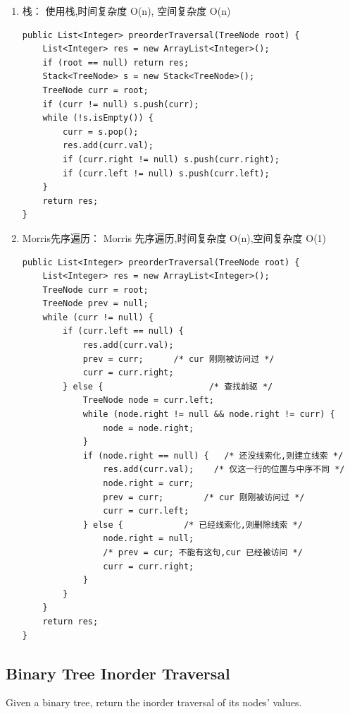 \documentclass[12pt]{book}
\begin{document}
\begin{enumerate}
\item 栈： 使用栈,时间复杂度 O(n), 空间复杂度 O(n)
\label{sec-4-2-1-1}

\lstset{language=java,label= ,caption= ,numbers=none}
\begin{lstlisting}
public List<Integer> preorderTraversal(TreeNode root) {
    List<Integer> res = new ArrayList<Integer>();
    if (root == null) return res;
    Stack<TreeNode> s = new Stack<TreeNode>();
    TreeNode curr = root;
    if (curr != null) s.push(curr);
    while (!s.isEmpty()) {
        curr = s.pop();
        res.add(curr.val);
        if (curr.right != null) s.push(curr.right);
        if (curr.left != null) s.push(curr.left);
    }
    return res;
}
\end{lstlisting}

\item Morris先序遍历： Morris 先序遍历,时间复杂度 O(n),空间复杂度 O(1)
\label{sec-4-2-1-2}

\lstset{language=java,label= ,caption= ,numbers=none}
\begin{lstlisting}
public List<Integer> preorderTraversal(TreeNode root) {
    List<Integer> res = new ArrayList<Integer>();
    TreeNode curr = root;
    TreeNode prev = null;
    while (curr != null) {
        if (curr.left == null) {
            res.add(curr.val);
            prev = curr;      /* cur 刚刚被访问过 */
            curr = curr.right;
        } else {                     /* 查找前驱 */
            TreeNode node = curr.left;
            while (node.right != null && node.right != curr) {
                node = node.right;
            }
            if (node.right == null) {   /* 还没线索化,则建立线索 */
                res.add(curr.val);    /* 仅这一行的位置与中序不同 */
                node.right = curr;
                prev = curr;        /* cur 刚刚被访问过 */
                curr = curr.left;
            } else {            /* 已经线索化,则删除线索 */
                node.right = null;
                /* prev = cur; 不能有这句,cur 已经被访问 */
                curr = curr.right;
            }
        }
    }
    return res;
}
\end{lstlisting}
\end{enumerate}

\subsection{Binary Tree Inorder Traversal}
\label{sec-4-2-2}
Given a binary tree, return the inorder traversal of its nodes' values.
\end{document}
